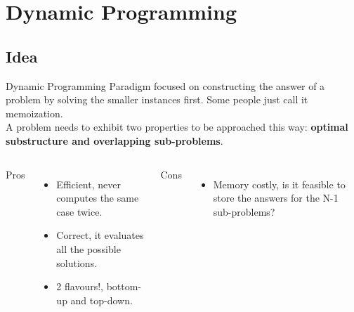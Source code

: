\documentclass[article]{beamer}
\begin{document}
\section{Dynamic Programming}
\subsection{Idea}

\begin{frame}[fragile]
	\begin{block}{Dynamic Programming}
	Paradigm focused on constructing the answer of a problem by
	solving the smaller instances first. Some people just call it memoization. 
	\\
	A problem needs to exhibit two properties to be approached this way: \textbf{optimal substructure and overlapping sub-problems}.
	\end{block}
\end{frame}

\begin{frame}[fragile]
	\begin{columns}
		Pros
		\begin{itemize}
			\item Efficient, never computes the same case twice.
			\item Correct, it evaluates all the possible solutions.
			\item 2 flavours!, bottom-up and top-down.
		\end{itemize}
		Cons
		\begin{itemize}
			\item Memory costly, is it feasible to store the answers for the N-1 sub-problems?
		\end{itemize}
	\end{columns}
\end{frame}

\end{document}
